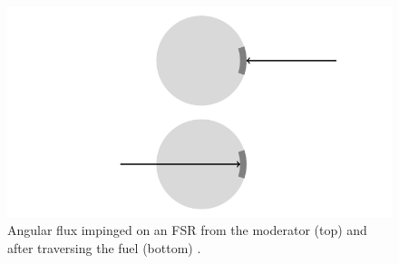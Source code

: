\begin{figure}[ht!]
  \centering
  \includegraphics[width=\linewidth]{figures/incoming-outgoing}
  \caption{Angular flux impinged on an FSR from the moderator (top) and after traversing the fuel (bottom) \citep{gibson2016thesis}.}
\label{fig:incoming-outgoing}
\end{figure}

